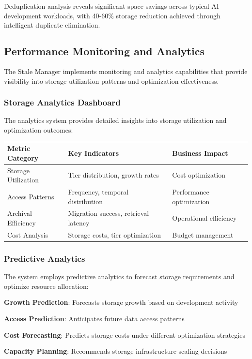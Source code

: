 Deduplication analysis reveals significant space savings across typical AI development workloads, with 40-60\% storage reduction achieved through intelligent duplicate elimination.

\subsection*{Performance Monitoring and Analytics}

The Stale Manager implements monitoring and analytics capabilities that provide visibility into storage utilization patterns and optimization effectiveness.

\subsubsection*{Storage Analytics Dashboard}

The analytics system provides detailed insights into storage utilization and optimization outcomes:

\begin{center}
\begin{tabular}{@{}lll@{}}
\toprule
\textbf{Metric Category} & \textbf{Key Indicators} & \textbf{Business Impact} \\
\midrule
Storage Utilization & Tier distribution, growth rates & Cost optimization \\
Access Patterns & Frequency, temporal distribution & Performance optimization \\
Archival Efficiency & Migration success, retrieval latency & Operational efficiency \\
Cost Analysis & Storage costs, tier optimization & Budget management \\
\bottomrule
\end{tabular}
\end{center}

\subsubsection*{Predictive Analytics}

The system employs predictive analytics to forecast storage requirements and optimize resource allocation:

\begin{compactlist}
    \item \textbf{Growth Prediction}: Forecasts storage growth based on development activity
    \item \textbf{Access Prediction}: Anticipates future data access patterns
    \item \textbf{Cost Forecasting}: Predicts storage costs under different optimization strategies
    \item \textbf{Capacity Planning}: Recommends storage infrastructure scaling decisions
\end{compactlist}

